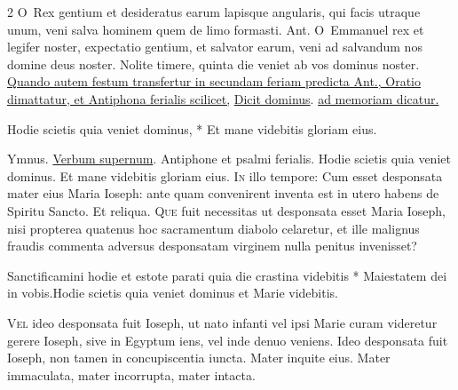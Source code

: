 \begin{multicols*}{2}
\lettrine[lines=2]{\zallmancaps \color{Blue} O}{}\ Rex gentium et desideratus earum lapisque angularis, qui facis utraque unum, veni salva hominem quem de limo formasti. {\color{Red} Ant.}
\lettrine[lines=2]{\zallmancaps \color{Red} O}{}\ Emmanuel rex et legifer noster, expectatio gentium, et salvator earum, veni ad salvandum nos domine deus noster.
 Nolite timere, quinta die veniet ab vos dominus noster.
\newline \ul{Quando autem festum transfertur in secundam feriam predicta Ant., Oratio dimattatur, et Antiphona ferialis scilicet,} \hyperlink{ant-dicit-dominus}{Dicit dominus}. \ul{ad memoriam dicatur.}
{\color{Red} }
\par {}
\begin{invitatory}
{Hodie scietis quia veniet dominus, * Et mane videbitis gloriam eius.}
\end{invitatory}
{\color{Red} Ymnus.} \hyperlink{verbum}{Verbum supernum}. Antiphone et psalmi ferialis. \V Hodie scietis quia veniet dominus. \R Et mane videbitis gloriam eius.
\lettrine[lines=2]{\zallmancaps \color{Blue} I}{n} illo tempore: Cum esset desponsata mater eius Maria Ioseph: ante quam convenirent inventa est in utero habens de Spiritu Sancto. Et reliqua.
\lettrine[lines=2]{\zallmancaps \color{Red} Q}{ue} fuit necessitas ut desponsata esset Maria Ioseph, nisi propterea quatenus hoc sacramentum diabolo celaretur, et ille malignus fraudis commenta adversus desponsatam virginem nulla penitus invenisset?
\begin{responsory}
{Sanctificamini hodie et estote parati quia die crastina videbitis * Maiestatem dei in vobis.}{Hodie scietis quia veniet dominus et Marie videbitis.}
\end{responsory}%
\lettrine[lines=2]{\zallmancaps \color{Blue} V}{el} ideo desponsata fuit Ioseph, ut nato infanti vel ipsi Marie curam videretur gerere Ioseph, sive in Egyptum iens, vel inde denuo veniens. Ideo desponsata fuit Ioseph, non tamen in concupiscentia iuncta. Mater inquite eius. Mater immaculata, mater incorrupta, mater intacta.

\end{multicols*}
